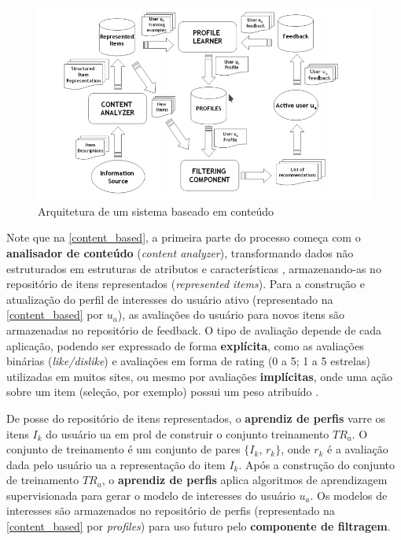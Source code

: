 \documentclass[12pt, openright, oneside, a4paper, brazil]{abntex2}
\begin{document}
\begin{figure}[h!tp]
	\caption{\label{content_based}Arquitetura de um sistema baseado em conteúdo}
	\begin{center}
		\includegraphics[scale=0.75]{images/content_based.png}
	\end{center}
\end{figure}

Note que na \autoref{content_based}, a primeira parte do processo começa com o \textbf{analisador de conteúdo} (\textit{content analyzer}), transformando dados não estruturados em estruturas de atributos e características \cite{lops2011content, mladenic1999text}, armazenando-as no repositório de itens representados (\textit{represented items}). Para a construção e atualização do perfil de interesses do usuário ativo (representado na \autoref{content_based} por $u_{a}$), as avaliações do usuário para novos itens são armazenadas no repositório de feedback. O tipo de avaliação depende de cada aplicação, podendo ser expressado de forma \textbf{explícita}, como as avaliações binárias (\textit{like/dislike}) e avaliações em forma de rating (0 a 5; 1 a 5 estrelas) utilizadas em muitos sites, ou mesmo por avaliações \textbf{implícitas}, onde uma ação sobre um item (seleção, por exemplo) possui um peso atribuído \cite{pazzani2007content}.

De posse do repositório de itens representados, o \textbf{aprendiz de perfis} varre os itens $I_{k}$ do usuário ua em prol de construir o conjunto treinamento $TR_{a}$. O conjunto de treinamento é um conjunto de pares $\lbrace I_{k}$, $r_{k} \rbrace$, onde $r_{k}$ é a avaliação dada pelo usuário ua a representação do item $I_{k}$. Após a construção do conjunto de treinamento $TR_{a}$, o \textbf{aprendiz de perfis} aplica algoritmos de aprendizagem supervisionada para gerar o modelo de interesses do usuário $u_{a}$. Os modelos de interesses são armazenados no repositório de perfis (representado na \autoref{content_based} por \textit{profiles}) para uso futuro pelo \textbf{componente de filtragem}.
\end{document}
